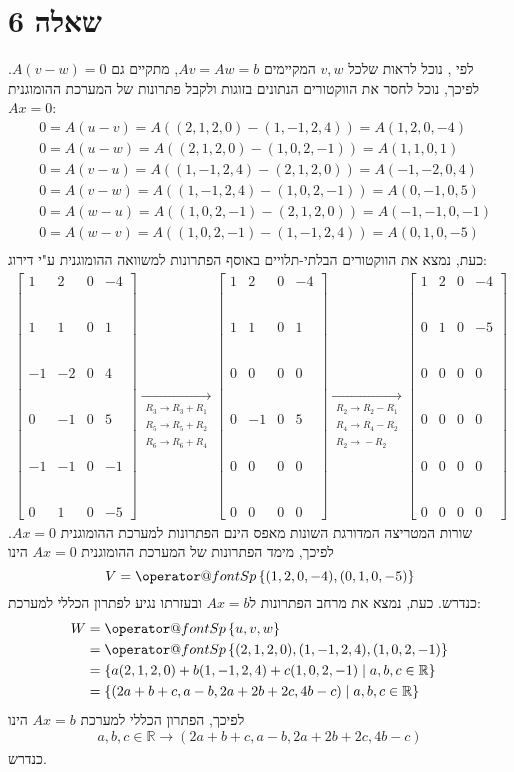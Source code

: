 \documentclass[11pt, oneside]{article}
\makeatletter
\newcommand{\qed}{\R{$\blacksquare$}}
\newcommand{\br}{\\\\\\\\\\\\}
\newcommand{\opr}[1]{\xrightarrow[\text{#1}]{}}
\newcommand{\oprm}[1]{\underset{\substack{#1}}{\longrightarrow}}
\newcommand{\mR}{\mathbb{R}}
\newcommand{\q}[3]{\R{שאלה #3#2.#1}}
\newcommand{\Sp}[1]{\mathop{\operator@font Sp}#1}
\makeatother
\begin{document}
\section{שאלה 6}
לפי \q{3}{7}{1.}, נוכל לראות שלכל $v, w$ המקיימים $Av = Aw = b$, מתקיים גם $A(v - w) = 0$. לפיכך, נוכל לחסר את הווקטורים הנתונים בזוגות ולקבל פתרונות של המערכת ההומוגנית $Ax = 0$:
\begin{align*}
& 0 = A(u - v) = A((2, 1, 2, 0) - (1, -1, 2, 4)) = A(1, 2, 0, -4)\\
& 0 = A(u - w) = A((2, 1, 2, 0) - (1, 0, 2, -1)) = A(1, 1, 0, 1)\\
& 0 = A(v - u) = A((1, -1, 2, 4) - (2, 1, 2, 0)) = A(-1, -2, 0, 4)\\
& 0 = A(v - w) = A((1, -1, 2, 4) - (1, 0, 2, -1)) = A(0, -1, 0, 5)\\
& 0 = A(w - u) = A((1, 0, 2, -1) - (2, 1, 2, 0)) = A(-1, -1, 0, -1)\\
& 0 = A(w - v) = A((1, 0, 2, -1) - (1, -1, 2, 4)) = A(0, 1, 0, -5)\\
\end{align*}
כעת, נמצא את הווקטורים הבלתי-תלויים באוסף הפתרונות למשוואה ההומוגנית ע"י דירוג:
\begin{align*}
\begin{bmatrix}
1 & 2 & 0 & -4\br
1 & 1 & 0 & 1\br
-1 & -2 & 0 & 4\br
0 & -1 & 0 & 5\br
-1 & -1 & 0 & -1\br
0 & 1 & 0 & -5
\end{bmatrix}
\oprm{%
R_3 \opr{} R_3 + R_1\\
R_5 \opr{} R_5 + R_2\\
R_6 \opr{} R_6 + R_4
}
\begin{bmatrix}
1 & 2 & 0 & -4\br
1 & 1 & 0 & 1\br
0 & 0 & 0 & 0\br
0 & -1 & 0 & 5\br
0 & 0 & 0 & 0\br
0 & 0 & 0 & 0
\end{bmatrix}
\oprm{%
R_2 \opr{} R_2 - R_1\\
R_4 \opr{} R_4 - R_2\\
R_2 \opr{} -R_2
}
\begin{bmatrix}
1 & 2 & 0 & -4\br
0 & 1 & 0 & -5\br
0 & 0 & 0 & 0\br
0 & 0 & 0 & 0\br
0 & 0 & 0 & 0\br
0 & 0 & 0 & 0
\end{bmatrix}
\end{align*}
שורות המטריצה המדורגת השונות מאפס הינם הפתרונות למערכת ההומוגנית $Ax = 0$. לפיכך, מימד הפתרונות של המערכת ההומוגנית $Ax = 0$ הינו
\[
V = \Sp\left\{(1, 2, 0, -4), (0, 1, 0, -5)\right\}
\]
כנדרש. כעת, נמצא את מרחב הפתרונות ל$Ax = b$ ובעזרתו נגיע לפתרון הכללי למערכת:
\begin{align*}
W
& = \Sp\left\{u, v, w\right\}\\
& = \Sp\left\{(2, 1, 2, 0), (1, -1, 2, 4), (1, 0, 2, -1)\right\}\\
& = \left\{a(2, 1, 2, 0) + b(1, -1, 2, 4) + c(1, 0, 2, -1) \mid a, b, c \in \mR\right\}\\
& = \left\{(2a + b + c, a - b, 2a + 2b + 2c, 4b - c) \mid a, b, c \in \mR\right\}
\end{align*}
לפיכך, הפתרון הכללי למערכת $Ax = b$ הינו
\[
a, b, c \in \mR \opr{} (2a + b + c, a - b, 2a + 2b + 2c, 4b - c)
\]
כנדרש.
\br\qed
\end{document}
